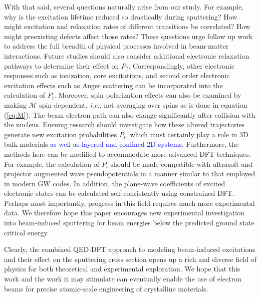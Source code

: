 \documentclass[twoside,twocolumn,9pt]{article}
\begin{document}
With that said, several questions naturally arise from our study.
For example, why is the excitation lifetime reduced so drastically during
sputtering?
How might excitation and relaxation rates of different transitions be
correlated?
How might preexisting defects affect those rates?
These questions urge follow up work to address the full breadth of physical
processes involved in beam-matter interactions.
Future studies should also consider additional electronic relaxation pathways
to determine their effect on $P_f$.
Correspondingly, other electronic responses such as ionization, core
excitations, and second order electronic excitation effects such as Auger
scattering can be incorporated into the calculation of $P_i$.
\cite{Lagarde2014,Kozawa2014,Nie2015,Shi2013b}
Moreover, spin polarization effects can also be examined by making $\mathcal{M}$
spin-dependent, \textit{i.e.}, not averaging over spins as is done in equation
(\ref{eq:M}).
The beam electron path can also change significantly after collision with
the nucleus.
Ensuing research should investigate how these altered trajectories generate new
excitation probabilities $P_i$, which must certainly play a role in 3D bulk
materials
\textcolor{blue}{
as well as layered and confined 2D systems.
\cite{Wang2019, KakanakovaGeorgieva2020, KakanakovaGeorgieva2021, Wang2021}
}
Furthermore, the methods here can be modified to accommodate more advanced DFT
techniques.
For example, the calculation of $P_i$ should be made compatible with ultrasoft
and projector augmented wave pseudopotentials \cite{Blochl1994} in a manner
similar to that employed in modern GW codes.\cite{Shishkin2006a, Gajdos2006,
Paier2005}
In addition, the plane-wave coefficients of excited electronic states can be
calculated self-consistently using constrained DFT.\cite{Kaduk2012}
Perhaps most importantly, progress in this field requires much more experimental
data.
We therefore hope this paper encourages new experimental investigation into
beam-induced sputtering for beam energies below the predicted ground state
critical energy.

Clearly, the combined QED-DFT approach to modeling beam-induced excitations and
their effect on the sputtering cross section opens up a rich and diverse field
of physics for both theoretical and experimental exploration.
We hope that this work and the work it may stimulate can eventually enable the
use of electron beams for precise atomic-scale engineering of crystalline
materials.

\end{document}
